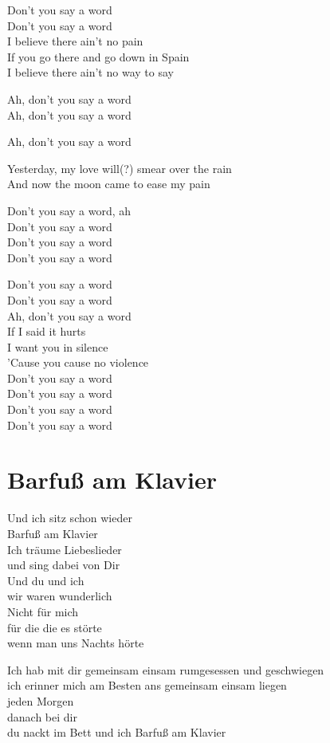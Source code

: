 \documentclass[]{book}
\begin{document}
Don't you say a word\\
Don't you say a word\\
I believe there ain't no pain\\
If you go there and go down in Spain\\
I believe there ain't no way to say

Ah, don't you say a word\\
Ah, don't you say a word

Ah, don't you say a word

Yesterday, my love will(?) smear over the rain\\
And now the moon came to ease my pain

Don't you say a word, ah\\
Don't you say a word\\
Don't you say a word\\
Don't you say a word

Don't you say a word\\
Don't you say a word\\
Ah, don't you say a word\\
If I said it hurts\\
I want you in silence\\
'Cause you cause no violence\\
Don't you say a word\\
Don't you say a word\\
Don't you say a word\\
Don't you say a word

\hypertarget{barfu-am-klavier-3}{%
\section{Barfuß am Klavier}\label{barfu-am-klavier-3}}

Und ich sitz schon wieder\\
Barfuß am Klavier\\
Ich träume Liebeslieder\\
und sing dabei von Dir\\
Und du und ich\\
wir waren wunderlich\\
Nicht für mich\\
für die die es störte\\
wenn man uns Nachts hörte

Ich hab mit dir gemeinsam einsam rumgesessen und geschwiegen\\
ich erinner mich am Besten ans gemeinsam einsam liegen\\
jeden Morgen\\
danach bei dir\\
du nackt im Bett und ich Barfuß am Klavier
\end{document}
